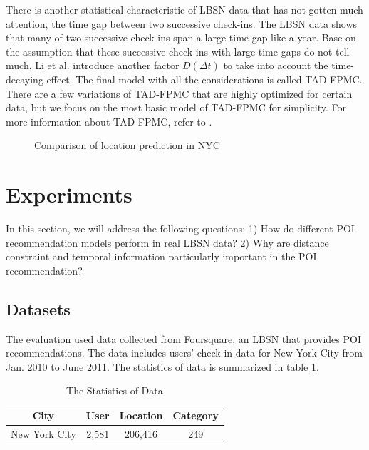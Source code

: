 \documentclass{sig-alternate}
\begin{document}
There is another statistical characteristic of LBSN data that has not gotten much attention, the time gap between 
two successive check-ins. The LBSN data shows that many of two successive check-ins span a large time gap 
like a year. Base on the assumption that these successive check-ins with large time gaps do not tell much, 
Li et al. \cite{Li:2017} introduce another factor $D(\Delta t)$ to take into account the time-decaying effect. 
The final model with all the considerations is called TAD-FPMC. There are a few variations of TAD-FPMC that 
are highly optimized for certain data, but we focus on the most basic model of TAD-FPMC for simplicity. 
For more information about TAD-FPMC, refer to \cite{Li:2017}.

\begin{figure}
\centering
{}
\caption{Comparison of location prediction in NYC \cite{Li:2017}}
\label{fig:ex_NYC}
\end{figure}

\section{Experiments}
\label{sec:experiments}
In this section, we will address the following questions: 1) How do different POI recommendation 
models perform in real LBSN data? 2) Why are distance constraint and temporal information particularly important 
in the POI recommendation?

\subsection{Datasets}
\label{sec:datasets}
The evaluation used data collected from Foursquare, an LBSN that provides POI recommendations. 
The data includes users' check-in data for New York City from Jan. 
2010 to June 2011. The statistics of data is summarized in table \ref{tab:stat}. \cite{Li:2017}

\begin{table}[ht]
\centering
\caption{The Statistics of Data \cite{Li:2017}}
\bigskip
\label{tab:stat}
\begin{tabular}{|c|c|c|c|}
        \hline
        City & User & Location & Category \\
        \hline
        New York City & 2,581 & 206,416 & 249 \\
        \hline
\end{tabular}
\end{table}
\end{document}

